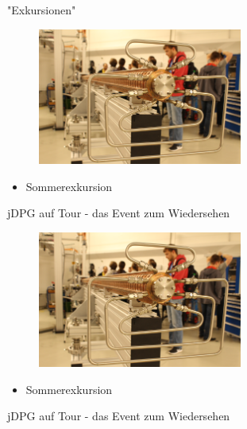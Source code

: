 \documentclass[
]{beamer}
\begin{document}
\begin{frame}{"Exkursionen"}
  \begin{minipage}[0.8\textwidth]
    \begin{figure}
      \centering
      \includegraphics[width=0.6\textwidth]{figure/soex_2017}
     \end{figure}
  \end{minipage}
  \begin{minipage}[0.2\textwidth]
    \begin{itemize}
      \item Sommerexkursion
    \end{itemize}
    jDPG auf Tour - das Event zum Wiedersehen
  \end{minipage}

  \begin{minipage}[0.8\textwidth]
    \begin{figure}
      \centering
      \includegraphics[width=0.6\textwidth]{figure/soex_2017}
     \end{figure}
  \end{minipage}
  \begin{minipage}[0.2\textwidth]
    \begin{itemize}
      \item Sommerexkursion
    \end{itemize}
    jDPG auf Tour - das Event zum Wiedersehen
  \end{minipage}
\end{frame}
\end{document}
